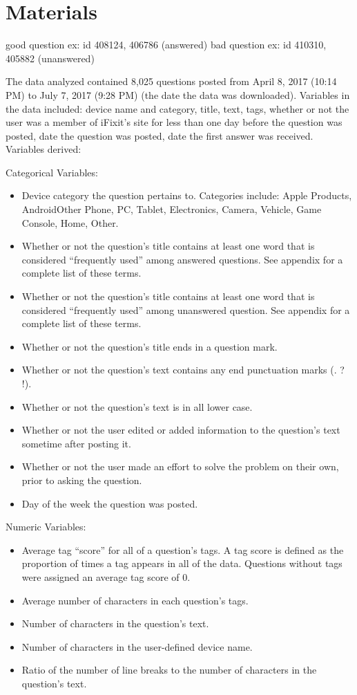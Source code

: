 \documentclass{article}
\begin{document}
\section*{Materials}

good question ex: id 408124, 406786 (answered)
bad question ex: id 410310, 405882 (unanswered) 

The data analyzed contained 8,025 questions posted from April 8, 2017 (10:14 PM) to July 7, 2017 (9:28 PM) (the date the data was downloaded). Variables in the data included: device name and category, title, text, tags, whether or not the user was a member of iFixit's site for less than one day before the question was posted, date the question was posted, date the first answer was received. Variables derived: 

Categorical Variables: 

\begin{itemize}
  \item Device category the question pertains to. Categories include: Apple Products, Android\/Other Phone, PC, Tablet, Electronics, Camera, Vehicle, Game Console, Home, Other.
  \item Whether or not the question's title contains at least one word that is considered ``frequently used'' among answered questions. See appendix for a complete list of these terms. 
  \item Whether or not the question's title contains at least one word that is considered ``frequently used'' among unanswered question. See appendix for a complete list of these terms. 
  \item Whether or not the question's title ends in a question mark.
  \item Whether or not the question's text contains any end punctuation marks (. ? !). 
  \item Whether or not the question's text is in all lower case. 
  \item Whether or not the user edited or added information to the question's text sometime after posting it.
  \item Whether or not the user made an effort to solve the problem on their own, prior to asking the question.
  \item Day of the week the question was posted. 
\end{itemize}

Numeric Variables:

\begin{itemize}
  \item Average tag ``score'' for all of a question's tags. A tag score is defined as the proportion of times a tag appears in all of the data. Questions without tags were assigned an average tag score of 0. 
  \item Average number of characters in each question's tags. 
  \item Number of characters in the question's text. 
  \item Number of characters in the user-defined device name. 
  \item Ratio of the number of line breaks to the number of characters in the question's text.
\end{itemize}
\end{document}
